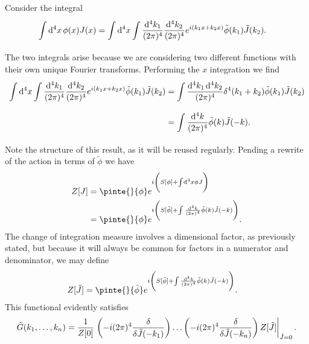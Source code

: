 Consider the integral
\begin{align*}
	\int\limits_{}^{}\dd[4]{x}\phi(x)J(x) &= \int\limits_{}^{}\dd[4]{x}\int\limits_{}^{}\frac{\dd[4]{k_{1}}}{(2\pi)^{4}}\frac{\dd[4]{k_{2}}}{(2\pi)^{4}}e^{i(k_{1}x + k_{2}x)}\tilde{\phi}(k_{1})\tilde{J}(k_{2}).
\end{align*}
The two integrals arise because we are considering two different functions with their own unique Fourier transforms. Performing the $x$ integration we find
\begin{align*}
	\int\limits_{}^{}\dd[4]{x}\int\limits_{}^{}\frac{\dd[4]{k_{1}}}{(2\pi)^{4}}\frac{\dd[4]{k_{2}}}{(2\pi)^{4}}e^{i(k_{1}x + k_{2}x)}\tilde{\phi}(k_{1})\tilde{J}(k_{2}) &= \int\limits_{}^{}\frac{\dd[4]{k_{1}}\dd[4]{k_{2}}}{(2\pi)^{4}}\delta^{4}(k_{1} + k_{2})\tilde{\phi}(k_{1})\tilde{J}(k_{2}) \\
	&= \int\limits_{}^{}\frac{\dd[4]{k}}{(2\pi)^{4}}\tilde{\phi}(k)\tilde{J}(-k).
\end{align*}
Note the structure of this result, as it will be reused regularly. Pending a rewrite of the action in terms of $\tilde{\phi}$ we have
\begin{align*}
	Z[J] &= \pinte{}{\phi}e^{i\left(S[\phi] + \inte{}{}\dd[4]{x}\phi J\right)} \\
	     &= \pinte{}{\phi}e^{i\left(S[\tilde{\phi}] + \inte{}{}\frac{\dd[4]{k}}{(2\pi)^{4}}\tilde{\phi}(k)\tilde{J}(-k)\right)}.
\end{align*}
The change of integration measure involves a dimensional factor, as previously stated, but because it will always be common for factors in a numerator and denominator, we may define
\begin{align*}
	Z[\tilde{J}] &= \pinte{}{\tilde{\phi}}e^{i\left(S[\tilde{\phi}] + \inte{}{}\frac{\dd[4]{k}}{(2\pi)^{4}}\tilde{\phi}(k)\tilde{J}(-k)\right)}.
\end{align*}
This functional evidently satisfies
\begin{align*}
	\tilde{G}(k_{1}, \dots, k_{n}) = \frac{1}{Z[0]}\eval{\left(-i(2\pi)^{4}\fdv{\tilde{J}(-k_{1})}\right)\dots\left(-i(2\pi)^{4}\fdv{\tilde{J}(-k_{n})}\right)Z[\tilde{J}]}_{\tilde{J} = 0}.
\end{align*}

